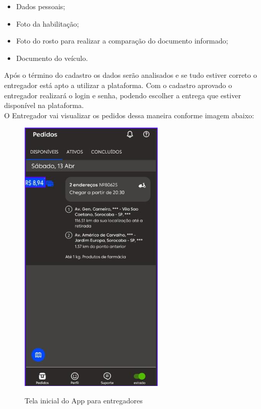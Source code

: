 \begin{itemize}
    \item Dados pessoais;
    \item Foto da habilitação;
    \item Foto do rosto para realizar a comparação do documento informado;
    \item Documento do veículo.
\end{itemize}

Após o término do cadastro os dados serão analisados e se tudo 
estiver correto o entregador está apto a utilizar a plataforma. Com o cadastro aprovado o entregador realizará o login e senha, podendo escolher a entrega que estiver disponível na plataforma.\\

O Entregador vai visualizar os pedidos dessa maneira conforme imagem abaixo:

\begin{figure} [!ht]
   {\centering
    \caption{Tela inicial do App para entregadores}
    \includegraphics[height=0.5\linewidth]{figuras/app para entregadores.png}
    \label{fig:enter-label}
    }
\end{figure}
\vspace{2cm}
 
